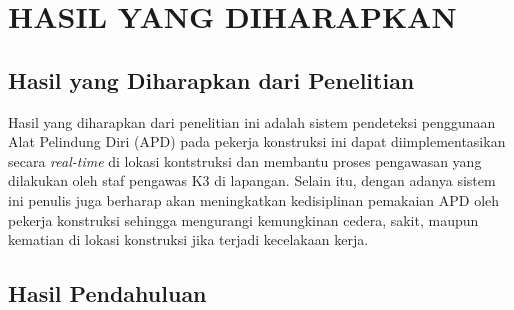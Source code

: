 \section{HASIL YANG DIHARAPKAN}

\subsection{Hasil yang Diharapkan dari Penelitian}

\par Hasil yang diharapkan dari penelitian ini adalah sistem pendeteksi penggunaan Alat Pelindung Diri (APD) pada pekerja konstruksi ini dapat diimplementasikan secara \emph{real-time} di lokasi kontstruksi dan membantu proses pengawasan yang dilakukan oleh staf pengawas K3 di lapangan. Selain itu, dengan adanya sistem ini penulis juga berharap akan meningkatkan kedisiplinan pemakaian APD oleh pekerja konstruksi sehingga mengurangi kemungkinan cedera, sakit, maupun kematian di lokasi konstruksi jika terjadi kecelakaan kerja.

\subsection{Hasil Pendahuluan}

\lipsum[16]

